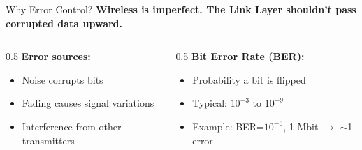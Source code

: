 \documentclass[aspectratio=169,11pt]{beamer}
\begin{document}
\begin{frame}{Why Error Control?}
    \textbf{Wireless is imperfect. The Link Layer shouldn't pass corrupted data upward.}
    
    \vspace{0.3cm}
    \begin{columns}[T]
        \begin{column}{0.5\textwidth}
            \textbf{Error sources:}
            \begin{itemize}
                \item Noise corrupts bits
                \item Fading causes signal variations
                \item Interference from other transmitters
            \end{itemize}
        \end{column}
        \begin{column}{0.5\textwidth}
            \textbf{Bit Error Rate (BER):}
            \begin{itemize}
                \item Probability a bit is flipped
                \item Typical: $10^{-3}$ to $10^{-9}$
                \item Example: BER=$10^{-6}$, 1 Mbit $\rightarrow$ $\sim$1 error
            \end{itemize}
        \end{column}
    \end{columns}
\end{frame}
\end{document}
